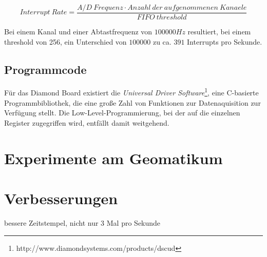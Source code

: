 \documentclass[12pt,a4paper]{scrartcl}
\begin{document}
\begin{equation}
Interrupt ~Rate = \frac{A/D ~Frequenz \cdot Anzahl ~der ~aufgenommenen ~Kanaele}{FIFO ~threshold}
\end{equation}

Bei einem Kanal und einer Abtastfrequenz von $100000 Hz$ resultiert, bei einem threshold von 256, ein Unterschied von $100000$ zu ca. $391$ Interrupts pro Sekunde.


\subsection{Programmcode}

Für das Diamond Board existiert die \textit{Universal Driver Software}\footnote{http://www.diamondsystems.com/products/dscud}, eine C-basierte Programmbibliothek, die eine große Zahl von Funktionen zur Datenaquisition zur Verfügung stellt. Die Low-Level-Programmierung, bei der auf die einzelnen Register zugegriffen wird, entfällt damit weitgehend. 



\section{Experimente am Geomatikum}


\section{Verbesserungen}

bessere Zeitstempel, nicht nur 3 Mal pro Sekunde

\clearpage
\newpage
\singlespacing
\appendix


\end{document}

